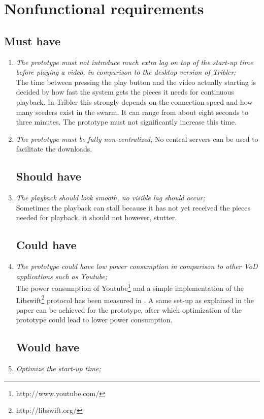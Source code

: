 \section{Nonfunctional requirements}

\subsection{Must have}
\begin{enumerate}
\item \emph{The prototype must not introduce much extra lag on top of the start-up time before playing a video, in comparison to the desktop version of Tribler;}\\
The time between pressing the play button and the video actually starting is decided by how fast the system gets the pieces it needs for continuous playback. In Tribler this strongly depends on the connection speed and how many seeders exist in the swarm. It can range from about eight seconds to three minutes. The prototype must not significantly increase this time.

\item \emph{The prototype must be fully non-centralized;}
No central servers can be used to facilitate the downloads.

\subsection{Should have}
\item \emph{The playback should look smooth, no visible lag should occur;}\\
Sometimes the playback can stall because it has not yet received the pieces needed for playback, it should not however, stutter.

\subsection{Could have}
\item \emph{The prototype could have low power consumption in comparison to other VoD applications such as Youtube;}\\
The power consumption of Youtube\footnote{http://www.youtube.com/} and a simple implementation of the Libswift\footnote{http://libswift.org/} protocol has been measured in \cite{libswift12}. A same set-up as explained in the paper can be achieved for the prototype, after which optimization of the prototype could lead to lower power consumption.

\subsection{Would have}
\item \emph{Optimize the start-up time;}

\end{enumerate}
